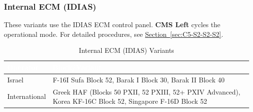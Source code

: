 \documentclass[11pt, a4paper, twoside]{report}
\newcommand{\secref}[1]{\hyperref[#1]{Section~\ref*{#1}}}
\begin{document}
\subsubsection{Internal ECM (IDIAS)}
\label{sec:C5-S3-S1-S2}

These variants use the IDIAS ECM control panel. \textbf{CMS Left} cycles the operational mode. For detailed procedures, see \secref{sec:C5-S2-S2-S2}.

\begin{table}[H]
\centering
\caption{Internal ECM (IDIAS) Variants}
\label{tab:C5-S3-internal-ecm}
\small
\renewcommand{\arraystretch}{1.25}
\begin{tabular}{|>{\raggedright\arraybackslash}p{3.0cm}|>{\raggedright\arraybackslash}p{5.8cm}|}
\hline
\rowcolor{headerblue}
\textcolor{white}{\textbf{Operator}} & \textcolor{white}{\textbf{Block/Variant}} \\
\hline
Israel & F-16I Sufa Block 52, Barak I Block 30, Barak II Block 40 \\
\hline
International & Greek HAF (Blocks 50 PXII, 52 PXIII, 52+ PXIV Advanced),
Korea KF-16C Block 52, Singapore F-16D Block 52 \\
\hline
\end{tabular}
\end{table}

\end{document}
